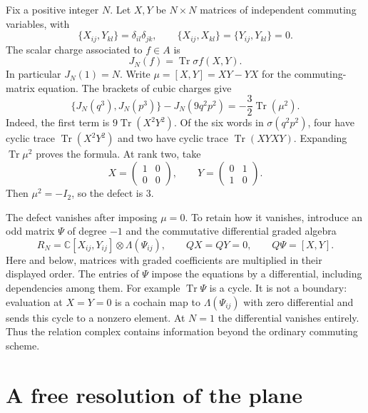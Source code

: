 Fix a positive integer $N$. Let $X,Y$ be $N\times N$ matrices of
independent commuting variables, with
\[
 \{X_{ij},Y_{kl}\}=\delta_{il}\delta_{jk},\qquad
 \{X_{ij},X_{kl}\}=\{Y_{ij},Y_{kl}\}=0.
\]
The scalar charge associated to $f\in A$ is
\begin{equation}\label{eq:vol2-matrix-charge}
 J_N(f)=\operatorname{Tr}\sigma f(X,Y).
\end{equation}
In particular $J_N(1)=N$. Write $\mu=[X,Y]=XY-YX$ for the
commuting-matrix equation. The brackets of cubic charges give
\begin{equation}\label{eq:vol2-cubic-trace-defect}
 \{J_N(q^3),J_N(p^3)\}-J_N(9q^2p^2)
   =-\frac32\operatorname{Tr}(\mu^2).
\end{equation}
Indeed, the first term is $9\operatorname{Tr}(X^2Y^2)$.
Of the six words in $\sigma(q^2p^2)$, four have cyclic trace
$\operatorname{Tr}(X^2Y^2)$ and two have cyclic trace
$\operatorname{Tr}(XYXY)$. Expanding $\operatorname{Tr}\mu^2$
proves the formula. At rank two, take
\[
 X=\begin{pmatrix}1&0\\0&0\end{pmatrix},\qquad
 Y=\begin{pmatrix}0&1\\1&0\end{pmatrix}.
\]
Then $\mu^2=-I_2$, so the defect is $3$.

The defect vanishes after imposing $\mu=0$. To retain how it
vanishes, introduce an odd matrix $\Psi$ of degree $-1$ and the
commutative differential graded algebra
\begin{equation}\label{eq:vol2-derived-matrix-algebra}
 R_N=\mathbb C[X_{ij},Y_{ij}]\otimes\Lambda(\Psi_{ij}),
 \qquad QX=QY=0,\qquad Q\Psi=[X,Y].
\end{equation}
Here and below, matrices with graded coefficients are multiplied
in their displayed order. The entries of $\Psi$ impose the
equations by a differential, including dependencies among them.
For example $\operatorname{Tr}\Psi$ is a cycle. It is not a
boundary: evaluation at $X=Y=0$ is a cochain map to
$\Lambda(\Psi_{ij})$ with zero differential and sends this cycle
to a nonzero element. At $N=1$ the differential vanishes entirely.
Thus the relation complex contains information beyond the
ordinary commuting scheme.

\section{A free resolution of the plane}
\label{sec:vol2-free-plane-resolution}


